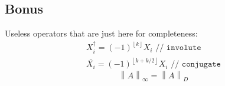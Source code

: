 \documentclass[twoside]{article}
\newcommand{\floor}[1]{{\left\lfloor{#1}\right\rfloor}}
\newcommand{\inorm}[1]{{\left\lVert{#1}\right\rVert}_\infty}
\newcommand{\dnorm}[1]{{\left\lVert{#1}\right\rVert}_D}
\newcommand{\pnorm}[1]{{\left\lVert{#1}\right\rVert}_P}
\newcommand{\boxedmath}[1]{\begin{center}\boxed{$$#1$$}\end{center}
    }
\begin{document}
\begin{multicols*}{2}
        \section{Bonus}
            \par
                Useless operators that are just here for completeness:
                \begin{gather*}
                    X_i^\dagger = (-1)^\floor{k} X_i \texttt{ // involute} \\
                    \bar{X_i} = (-1)^\floor{k+k/2} X_i \texttt{ // conjugate}
                \end{gather*}
                $$ \inorm{A} = \dnorm{A} $$
                \boxedmath{\begin{gathered}
                    \inorm{A} = \pnorm{A}
                \end{gathered}}
    \end{multicols*}
\end{document}
